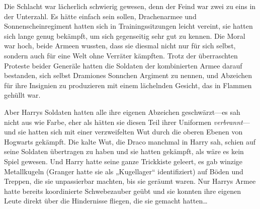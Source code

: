 Die Schlacht war lächerlich schwierig gewesen, denn der Feind war zwei zu eins in der Unterzahl. Es hätte einfach sein sollen, Drachenarmee und Sonnenscheinregiment hatten sich in Trainingssitzungen leicht vereint, sie hatten sich lange genug bekämpft, um sich gegenseitig sehr gut zu kennen. Die Moral war hoch, beide Armeen wussten, dass sie diesmal nicht nur für sich selbst, sondern auch für eine Welt ohne Verräter kämpften. Trotz der überraschten Proteste beider Generäle hatten die Soldaten der kombinierten Armee darauf bestanden, sich selbst Dramiones Sonnchen Argiment zu nennen, und Abzeichen für ihre Insignien zu produzieren mit einem lächelnden Gesicht, das in Flammen gehüllt war.

Aber Harrys Soldaten hatten alle ihre eigenen Abzeichen geschwärzt—es sah nicht aus wie Farbe, eher als hätten sie diesen Teil ihrer Uniformen \emph{verbrannt}—und sie hatten sich mit einer verzweifelten Wut durch die oberen Ebenen von Hogwarts gekämpft. Die kalte Wut, die Draco manchmal in Harry sah, schien auf seine Soldaten übertragen zu haben und sie hatten gekämpft, als wäre es kein Spiel gewesen. Und Harry hatte seine ganze Trickkiste geleert, es gab winzige Metallkugeln (Granger hatte sie als „Kugellager“ identifiziert) auf Böden und Treppen, die sie unpassierbar machten, bis sie geräumt waren. Nur Harrys Armee hatte bereits koordinierte Schwebezauber geübt und sie konnten ihre eigenen Leute direkt über die Hindernisse fliegen, die sie gemacht hatten…

